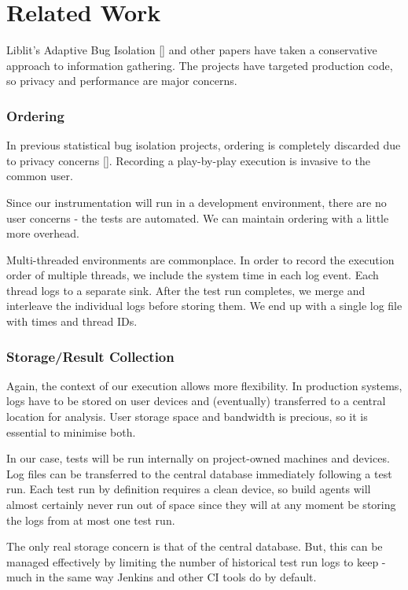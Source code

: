 \section{Related Work}
\label{sec:relwork}

Liblit’s Adaptive Bug Isolation [] and other papers have taken a conservative
approach to information gathering. The projects have targeted production code,
so privacy and performance are major concerns.

\subsubsection{Ordering}

In previous statistical bug isolation projects, ordering is completely discarded
due to privacy concerns []. Recording a play-by-play execution is invasive to
the common user.

Since our instrumentation will run in a development environment, there are no
user concerns - the tests are automated. We can maintain ordering with a little
more overhead.

Multi-threaded environments are commonplace. In order to record the execution
order of multiple threads, we include the system time in each log event. Each
thread logs to a separate sink. After the test run completes, we merge and
interleave the individual logs before storing them. We end up with a single log
file with times and thread IDs.

\subsubsection{Storage/Result Collection}

Again, the context of our execution allows more flexibility. In production
systems, logs have to be stored on user devices and (eventually) transferred to
a central location for analysis. User storage space and bandwidth is precious,
so it is essential to minimise both.

In our case, tests will be run internally on project-owned machines and devices.
Log files can be transferred to the central database immediately following a
test run. Each test run by definition requires a clean device, so build agents
will almost certainly never run out of space since they will at any moment be
storing the logs from at most one test run.

The only real storage concern is that of the central database. But, this can be
managed effectively by limiting the number of historical test run logs to keep -
much in the same way Jenkins and other CI tools do by default.

